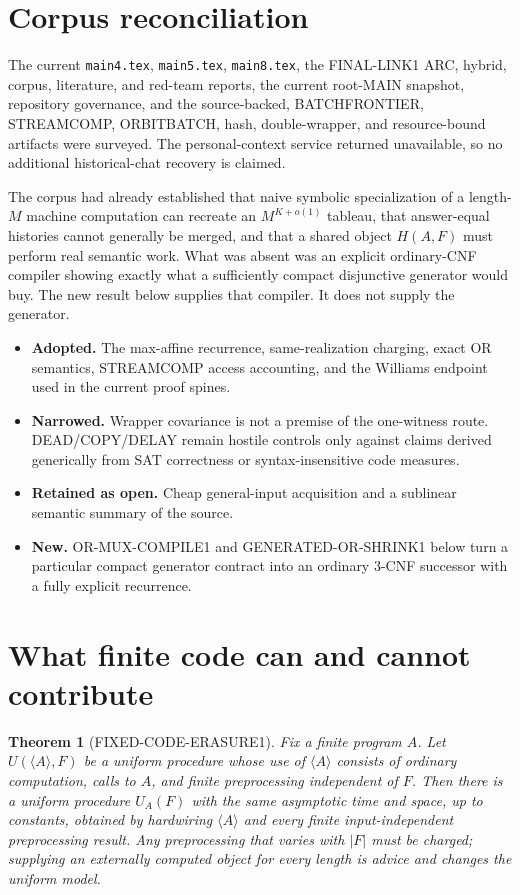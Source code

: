 \documentclass[11pt]{article}
\newtheorem{theorem}{Theorem}
\begin{document}
\section{Corpus reconciliation}

The current \texttt{main4.tex}, \texttt{main5.tex}, \texttt{main8.tex}, the
FINAL-LINK1 ARC, hybrid, corpus, literature, and red-team reports, the current
root-MAIN snapshot, repository governance, and the source-backed,
BATCHFRONTIER, STREAMCOMP, ORBITBATCH, hash, double-wrapper, and resource-bound
artifacts were surveyed.  The personal-context service returned unavailable,
so no additional historical-chat recovery is claimed.

The corpus had already established that naive symbolic specialization of a
length-$M$ machine computation can recreate an $M^{K+o(1)}$ tableau, that
answer-equal histories cannot generally be merged, and that a shared object
$H(A,F)$ must perform real semantic work.  What was absent was an explicit
ordinary-CNF compiler showing exactly what a sufficiently compact disjunctive
generator would buy.  The new result below supplies that compiler.  It does
not supply the generator.

\begin{itemize}
\item[] \textbf{Adopted.}  The max-affine recurrence, same-realization
charging, exact OR semantics, STREAMCOMP access accounting, and the Williams
endpoint used in the current proof spines.
\item[] \textbf{Narrowed.}  Wrapper covariance is not a premise of the
one-witness route.  DEAD/COPY/DELAY remain hostile controls only against claims
derived generically from SAT correctness or syntax-insensitive code measures.
\item[] \textbf{Retained as open.}  Cheap general-input acquisition and a
sublinear semantic summary of the source.
\item[] \textbf{New.}  OR-MUX-COMPILE1 and GENERATED-OR-SHRINK1 below turn a
particular compact generator contract into an ordinary 3-CNF successor with a
fully explicit recurrence.
\end{itemize}

\section{What finite code can and cannot contribute}

\begin{theorem}[FIXED-CODE-ERASURE1]
Fix a finite program $A$.  Let $U(\langle A\rangle,F)$ be a uniform procedure
whose use of $\langle A\rangle$ consists of ordinary computation, calls to
$A$, and finite preprocessing independent of $F$.  Then there is a uniform
procedure $U_A(F)$ with the same asymptotic time and space, up to constants,
obtained by hardwiring $\langle A\rangle$ and every finite input-independent
preprocessing result.  Any preprocessing that varies with $|F|$ must be
charged; supplying an externally computed object for every length is advice
and changes the uniform model.
\end{theorem}
\end{document}
